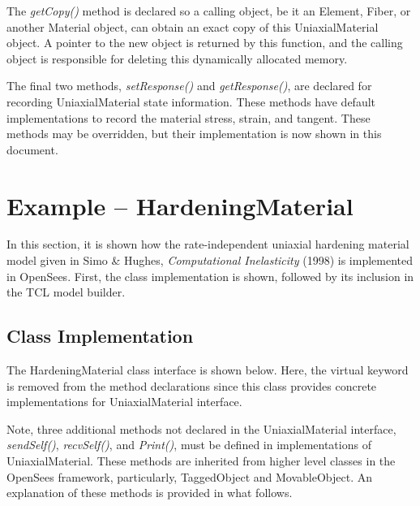 \documentclass[12pt]{article}
\begin{document}
The {\em getCopy()} method is declared so a calling object, be it an Element, Fiber, or
another Material object, can obtain an exact copy of this UniaxialMaterial object. A pointer
to the new object is returned by this function, and the calling object is responsible for
deleting this dynamically allocated memory.

The final two methods, {\em setResponse()} and {\em getResponse()}, are declared for
recording UniaxialMaterial state information. These methods have default implementations
to record the material stress, strain, and tangent. These methods may be overridden, but
their implementation is now shown in this document.

\section{Example -- HardeningMaterial}
In this section, it is shown how the rate-independent uniaxial hardening material model
given in Simo \& Hughes, {\em Computational Inelasticity} (1998) is implemented in OpenSees.
First, the class implementation
is shown, followed by its inclusion in the TCL model builder.

\subsection{Class Implementation}
The HardeningMaterial class
interface is shown below. Here, the virtual keyword is removed from the method declarations
since this class provides concrete implementations for UniaxialMaterial interface.

Note, three additional methods not declared in the UniaxialMaterial interface,
{\em sendSelf()}, {\em recvSelf()}, and {\em Print()}, must be defined in implementations 
of UniaxialMaterial. These methods are inherited from higher level classes in the OpenSees
framework, particularly, TaggedObject and MovableObject. An explanation of these methods
is provided in what follows.
\end{document}
